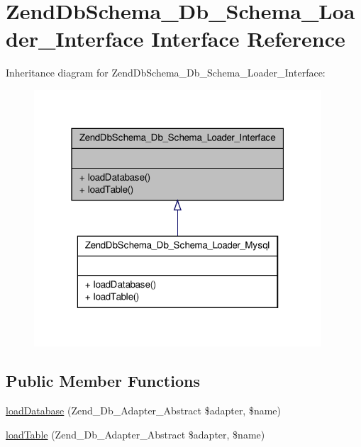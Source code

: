 \hypertarget{interfaceZendDbSchema__Db__Schema__Loader__Interface}{\section{\-Zend\-Db\-Schema\-\_\-\-Db\-\_\-\-Schema\-\_\-\-Loader\-\_\-\-Interface \-Interface \-Reference}
\label{interfaceZendDbSchema__Db__Schema__Loader__Interface}
}


\-Inheritance diagram for \-Zend\-Db\-Schema\-\_\-\-Db\-\_\-\-Schema\-\_\-\-Loader\-\_\-\-Interface\-:\nopagebreak
\begin{figure}[H]
\begin{center}
\leavevmode
\includegraphics[width=304pt]{interfaceZendDbSchema__Db__Schema__Loader__Interface__inherit__graph}
\end{center}
\end{figure}
\subsection*{\-Public \-Member \-Functions}
\begin{DoxyCompactItemize}
\item 
\hyperlink{interfaceZendDbSchema__Db__Schema__Loader__Interface_a1c1c3235cdcb31939507aa988a4df708}{load\-Database} (\-Zend\-\_\-\-Db\-\_\-\-Adapter\-\_\-\-Abstract \$adapter, \$name)
\item 
\hyperlink{interfaceZendDbSchema__Db__Schema__Loader__Interface_acc4d40a1927e6c3679d6070956683fb6}{load\-Table} (\-Zend\-\_\-\-Db\-\_\-\-Adapter\-\_\-\-Abstract \$adapter, \$name)
\end{DoxyCompactItemize}


